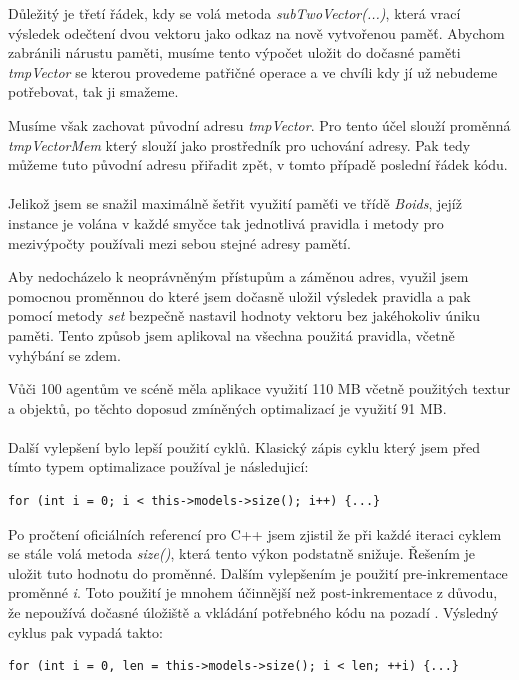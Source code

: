 \documentclass[czech,public,dept460,male,cpdeclaration]{diploma}
\begin{document}
Důležitý je třetí řádek, kdy se volá metoda \textit{subTwoVector(...)}, která vrací výsledek odečtení dvou vektoru jako odkaz na nově vytvořenou paměť. Abychom zabránili nárustu paměti, musíme tento výpočet uložit do dočasné paměti \textit{tmpVector} se kterou provedeme patřičné operace a ve chvíli kdy jí už nebudeme potřebovat, tak ji smažeme.

Musíme však zachovat původní adresu \textit{tmpVector}. Pro tento účel slouží proměnná \\\textit{tmpVectorMem} který slouží jako prostředník pro uchování adresy. Pak tedy můžeme tuto původní adresu přiřadit zpět, v tomto případě poslední řádek kódu.
\\\\
Jelikož jsem se snažil maximálně šetřit využití paměťi ve třídě \textit{Boids}, jejíž instance je volána v každé smyčce tak jednotlivá pravidla i metody pro mezivýpočty používali mezi sebou stejné adresy pamětí.

Aby nedocházelo k neoprávněným přístupům a záměnou adres, využil jsem pomocnou proměnnou do které jsem dočasně uložil výsledek pravidla a pak pomocí metody \textit{set} bezpečně nastavil hodnoty vektoru bez jakéhokoliv úniku paměti. Tento způsob jsem aplikoval na všechna použitá pravidla, včetně vyhýbání se zdem.

Vůči 100 agentům ve scéně měla aplikace využití 110 MB včetně použitých textur a objektů, po těchto doposud zmíněných optimalizací je využití 91 MB.
\\\\
Další vylepšení bylo lepší použití cyklů. Klasický zápis cyklu který jsem před tímto typem optimalizace používal je následujicí:\newpage
\begin{lstlisting}[label=src:classic cycle,caption=Použití klasického cyklu] 
for (int i = 0; i < this->models->size(); i++) {...}
\end{lstlisting}
Po pročtení oficiálních referencí pro C++ \cite{linkToCppReference} jsem zjistil že při každé iteraci cyklem se stále volá metoda \textit{size()}, která tento výkon podstatně snižuje. Řešením je uložit tuto hodnotu do proměnné. Dalším vylepšením je použití pre-inkrementace proměnné \textit{i}. Toto použití je mnohem účinnější než post-inkrementace z důvodu, že nepoužívá dočasné úložiště a vkládání potřebného kódu na pozadí \cite{linkToPreIncrementation}. Výsledný cyklus pak vypadá takto:
\begin{lstlisting}[label=src:optimalized cycle,caption=Použití optimalizovaného cyklu] 
for (int i = 0, len = this->models->size(); i < len; ++i) {...}
\end{lstlisting}
\end{document}
